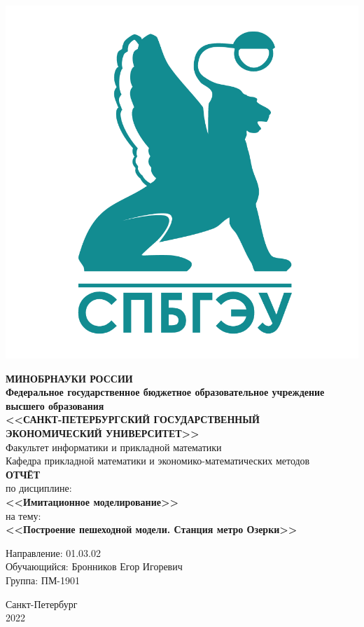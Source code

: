 \documentclass[14pt,fleqn]{extarticle}
\begin{document}
	\begin{titlepage}
		\includegraphics[scale=0.12]{logo}
		\begin{center}
			\textbf{МИНОБРНАУКИ РОССИИ}\\
			\vspace{0.2cm}
			\textbf{Федеральное государственное бюджетное образовательное учреждение высшего образования}\\
			\textbf{<<САНКТ-ПЕТЕРБУРГСКИЙ ГОСУДАРСТВЕННЫЙ ЭКОНОМИЧЕСКИЙ УНИВЕРСИТЕТ>>}\\
			\vspace{0.6cm}
			Факультет информатики и прикладной математики\\
			Кафедра прикладной математики и экономико-математических методов\\
			\vspace{1cm}
			\textbf{ОТЧЁТ}\\
			по дисциплине:\\
			\textbf{<<Имитационное моделирование>>}\\
			на тему:\\
			\textbf{<<Построение пешеходной модели. Станция метро Озерки>>}\\
		\end{center}
		\vspace{1cm}
		Направление: 01.03.02\\
		Обучающийся: Бронников Егор Игоревич\\
		Группа: ПМ-1901\\
		\vfill
		\begin{center}
			Санкт-Петербург\\
			2022\\
		\end{center}
	\end{titlepage}
\end{document}
